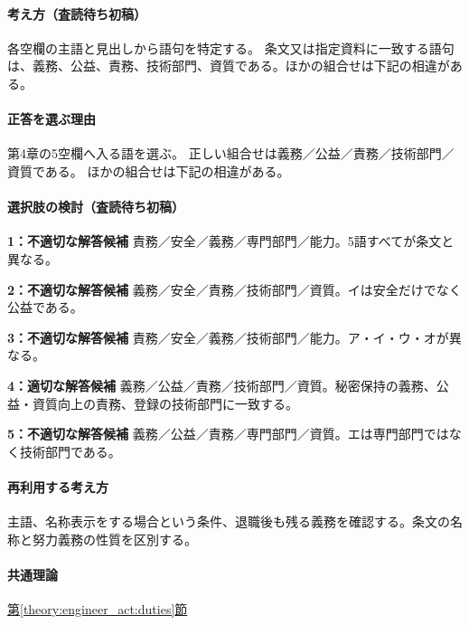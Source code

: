 \paragraph{考え方（査読待ち初稿）} 各空欄の主語と見出しから語句を特定する。 条文又は指定資料に一致する語句は、義務、公益、責務、技術部門、資質である。ほかの組合せは下記の相違がある。

\paragraph{正答を選ぶ理由} 第4章の5空欄へ入る語を選ぶ。 正しい組合せは義務／公益／責務／技術部門／資質である。 ほかの組合せは下記の相違がある。

\paragraph{選択肢の検討（査読待ち初稿）}\mbox{}\par

\noindent\textbf{1：不適切な解答候補} 責務／安全／義務／専門部門／能力。5語すべてが条文と異なる。\par

\noindent\textbf{2：不適切な解答候補} 義務／安全／責務／技術部門／資質。イは安全だけでなく公益である。\par

\noindent\textbf{3：不適切な解答候補} 責務／安全／義務／技術部門／能力。ア・イ・ウ・オが異なる。\par

\noindent\textbf{4：適切な解答候補} 義務／公益／責務／技術部門／資質。秘密保持の義務、公益・資質向上の責務、登録の技術部門に一致する。\par

\noindent\textbf{5：不適切な解答候補} 義務／公益／責務／専門部門／資質。エは専門部門ではなく技術部門である。\par

\paragraph{再利用する考え方} 主語、名称表示をする場合という条件、退職後も残る義務を確認する。条文の名称と努力義務の性質を区別する。

\paragraph{共通理論} \hyperref[theory:engineer_act:duties]{第\ref*{theory:engineer_act:duties}節}

